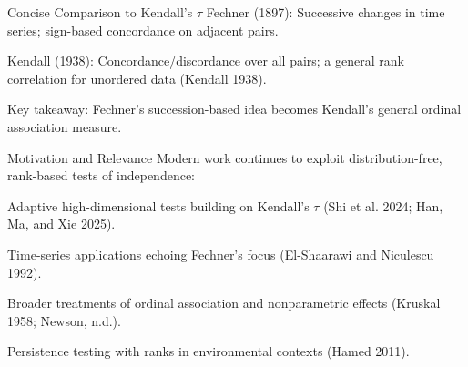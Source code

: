 \documentclass[
  ignorenonframetext,
]{beamer}
\begin{document}
\begin{frame}{Concise Comparison to Kendall's \(\tau\)}
\label{concise-comparison-to-kendalls-tau}
Fechner (1897): Successive changes in time series; sign-based
concordance on adjacent pairs.

Kendall (1938): Concordance/discordance over all pairs; a general rank
correlation for unordered data (Kendall 1938).

Key takeaway: Fechner's succession-based idea becomes Kendall's general
ordinal association measure.
\end{frame}

\begin{frame}{Motivation and Relevance}
\label{motivation-and-relevance}
Modern work continues to exploit distribution-free, rank-based tests of
independence:

Adaptive high-dimensional tests building on Kendall's \(\tau\) (Shi et
al. 2024; Han, Ma, and Xie 2025).

Time-series applications echoing Fechner's focus (El-Shaarawi and
Niculescu 1992).

Broader treatments of ordinal association and nonparametric effects
(Kruskal 1958; Newson, n.d.).

Persistence testing with ranks in environmental contexts (Hamed 2011).
\end{frame}
\end{document}
